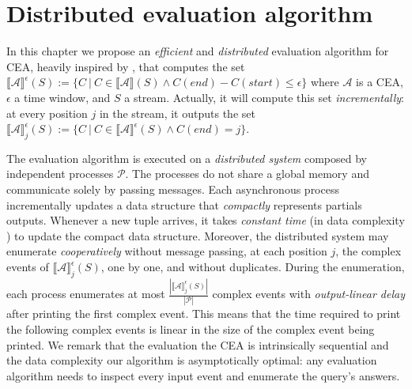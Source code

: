 \chapter{Distributed evaluation algorithm}\label{chapter:algorithm}

In this chapter we propose an \emph{efficient} and \emph{distributed} evaluation algorithm for CEA, heavily inspired by \cite{core}, that computes the set ${\llbracket \mathcal{A} \rrbracket}^{\epsilon}(S) := \{ C \ | \ C \in {\llbracket \mathcal{A} \rrbracket}(S) \land C(end) - C(start) \le \epsilon\}$ where $\mathcal{A}$ is a CEA, $\epsilon$ a time window, and $S$ a stream. Actually, it will compute this set \emph{incrementally}: at every position $j$ in the stream, it outputs the set ${\llbracket \mathcal{A} \rrbracket}^{\epsilon}_{j}(S) := \{ C \ | \ C \in {\llbracket \mathcal{A} \rrbracket}^{\epsilon}(S) \land C(end) = j \}$.

The evaluation algorithm is executed on a \emph{distributed system} composed by independent processes $\mathcal{P}$. The processes do not share a global memory and communicate solely by passing messages. Each asynchronous process incrementally updates a data structure that \emph{compactly} represents partials outputs. Whenever a new tuple arrives, it takes \emph{constant time} (in data complexity \cite{data-complexity}) to update the compact data structure. Moreover, the distributed system may enumerate \emph{cooperatively} without message passing, at each position $j$, the complex events of ${\llbracket \mathcal{A} \rrbracket}^{\epsilon}_{j}(S)$, one by one, and without duplicates. During the enumeration, each process enumerates at most $\frac{|{\llbracket \mathcal{A} \rrbracket}^{\epsilon}_{j}(S)|}{|\mathcal{P}|}$ complex events with \emph{output-linear delay} after printing the first complex event. This means that the time required to print the following complex events is linear in the size of the complex event being printed. We remark that the evaluation the CEA is intrinsically sequential and the data complexity our algorithm is asymptotically optimal: any evaluation algorithm needs to inspect every input event and enumerate the query's answers.

